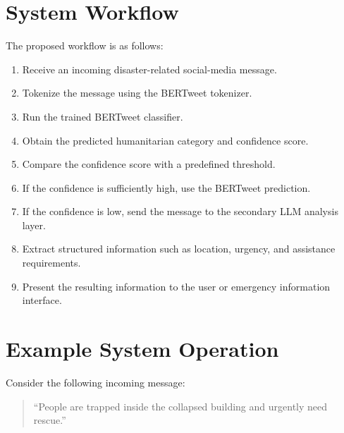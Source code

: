 \documentclass[12pt,a4paper]{article}
\begin{document}
\section{System Workflow}

The proposed workflow is as follows:

\begin{enumerate}
    \item Receive an incoming disaster-related social-media message.
    
    \item Tokenize the message using the BERTweet tokenizer.
    
    \item Run the trained BERTweet classifier.
    
    \item Obtain the predicted humanitarian category and confidence score.
    
    \item Compare the confidence score with a predefined threshold.
    
    \item If the confidence is sufficiently high, use the BERTweet prediction.
    
    \item If the confidence is low, send the message to the secondary LLM
    analysis layer.
    
    \item Extract structured information such as location, urgency, and
    assistance requirements.
    
    \item Present the resulting information to the user or emergency
    information interface.
\end{enumerate}

\section{Example System Operation}

Consider the following incoming message:

\begin{quote}
``People are trapped inside the collapsed building and urgently need rescue.''
\end{quote}
\end{document}
